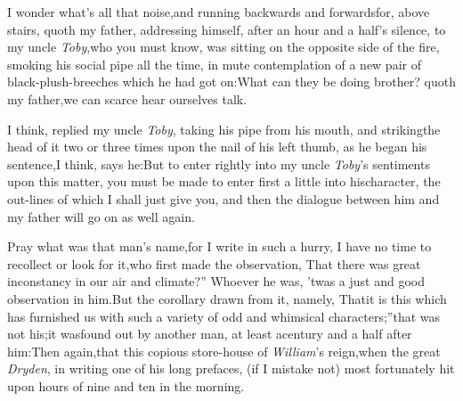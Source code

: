 \documentclass[twoside]{article}
\begin{document}
\quad\tsh I wonder what’s
all that noise,\break and running backwards and forwards\break for, above
stairs, quoth my father, addressing himself, after an hour and a\break
half’s silence, to my uncle \textit{Toby},\tsh who
you must know, was sitting on the opposite side of the fire,
smoking his social pipe all the time, in mute contemplation of a
new pair of black-plush-breeches\break
which he had got on:\tsk What
can they be doing brother? quoth my father,\tsk\break we can
scarce hear ourselves talk.

I think, replied my uncle \textit{Toby}, taking his pipe from his
mouth, and striking\break the head of it two or three times upon the nail
of his left thumb, as he began his sentence,\tsh I think,
says he:\tsh\break But to enter rightly into my uncle
\textit{Toby}’s sentiments upon this matter, you must be made
to enter first a little into his\break character, the out-lines of which
I shall just give you, and then the dialogue between
him and my father will go on as well again.

\tsk Pray what was that man’s name,\tsk\break for I write in such a
hurry, I have no time to recollect or look for it,\tsh who
first made the observation, \lqq That there was great
inconstancy in our air and climate?” Whoever he was,
’twas a just and good observation in him.\tsk But the
corollary drawn from it, namely, \lqq That\break it is this which
has furnished us with such a variety of odd and whimsical
characters;”\tsk that was not his;\tsk it was\break found out
by another man, at least a\break century and a half after him:\tsk Then\break
again,\tsk that this copious store-house of 
\textit{William}’s reign,\tsk when the great \textit{Dryden},
in writing one of his
long prefaces, (if I mistake not) most fortunately hit upon\break
{}
hours of nine and ten in the morning.
\end{document}

